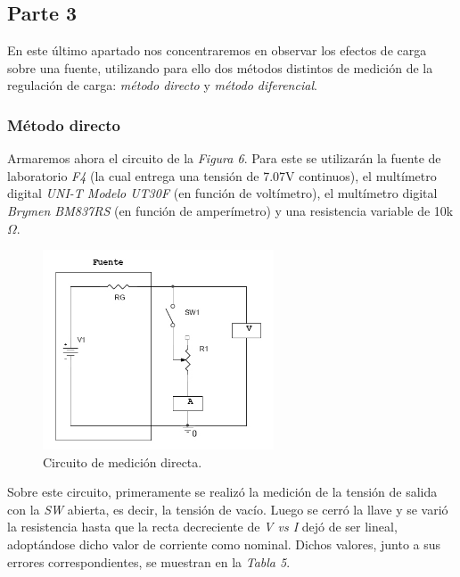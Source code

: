 \documentclass{article}
\begin{document}
\subsection{Parte 3}

	En este último apartado nos concentraremos en observar los efectos de carga sobre una fuente, utilizando para ello dos métodos distintos de medición de la regulación de carga: \textit{método directo} y \textit{método diferencial}.
\bigskip



\subsubsection{Método directo}

	Armaremos ahora el circuito de la \textit{Figura 6}. Para este se utilizarán la fuente de laboratorio \textit{F4} (la cual entrega una tensión de 7.07V continuos), el multímetro digital \textit{UNI-T Modelo UT30F} (en función de voltímetro), el multímetro digital \textit{Brymen BM837RS} (en función de amperímetro) y una resistencia variable de 10k$\Omega$.
\bigskip


\begin{figure}[h]
	\centering
	\includegraphics[width=0.61\textwidth]{images/p3-item-a.jpg}
	\caption{Circuito de medición directa.}
\end{figure}
\bigskip\bigskip


\noindent Sobre este circuito, primeramente se realizó la medición de la tensión de salida con la \textit{SW} abierta, es decir, la tensión de vacío. Luego se cerró la llave y se varió la resistencia hasta que la recta decreciente de \textit{V vs I} dejó de ser lineal, adoptándose dicho valor de corriente como nominal. Dichos valores, junto a sus errores correspondientes, se muestran en la \textit{Tabla 5}.
\bigskip\bigskip
\end{document}
